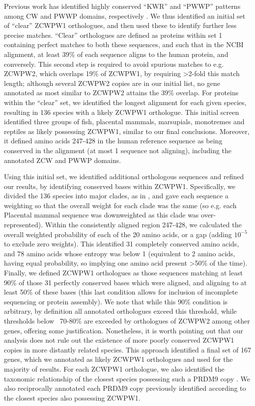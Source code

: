 Previous work has identified highly conserved “KWR” and “PWWP” patterns among CW and PWWP domains, respectively \parencite{He2010Structural, Qin2014Structure}.
We thus identified an initial set of “clear” ZCWPW1 orthologues, and then used these to identify further less precise matches.
“Clear” orthologues are defined as proteins within set 1 containing perfect matches to both these sequences, and such that in the NCBI alignment, at least 39\% of each sequence aligns to the human protein, and conversely.
This second step is required to avoid spurious matches to e.g. ZCWPW2, which overlaps 19\% of ZCWPW1, by requiring >2-fold this match length; although several ZCWPW2 copies are in our initial list, no gene annotated as most similar to ZCWPW2 attains the 39\% overlap.
For proteins within the “clear” set, we identified the longest alignment for each given species, resulting in 136 species with a likely ZCWPW1 orthologue.
This initial screen identified three groups of fish, placental mammals, marsupials, monotremes and reptiles as likely possessing ZCWPW1, similar to our final conclusions.
Moreover, it defined amino acids 247-428 in the human reference sequence as being conserved in the alignment (at most 1 sequence not aligning), including the annotated ZCW and PWWP domains.

Using this initial set, we identified additional orthologous sequences and refined our results, by identifying conserved bases within ZCWPW1.
Specifically, we divided the 136 species into major clades, as in \parencite{Baker2017Repeated}, and gave each sequence a weighting so that the overall weight for each clade was the same (so e.g. each Placental mammal sequence was downweighted as this clade was over-represented).
Within the consistently aligned region 247-428, we calculated the overall weighted probability of each of the 20 amino acids, or a gap (adding $10^{-5}$ to exclude zero weights).
This identified 31 completely conserved amino acids, and 78 amino acids whose entropy was below 1 (equivalent to 2 amino acids, having equal probability, so implying one amino acid present >50\% of the time).
Finally, we defined ZCWPW1 orthologues as those sequences matching at least 90\% of those 31 perfectly conserved bases which were aligned, and aligning to at least 50\% of these bases (this last condition allows for inclusion of incomplete sequencing or protein assembly).
We note that while this 90\% condition is arbitrary, by definition all annotated orthologues exceed this threshold, while thresholds below ~70-80\% are exceeded by orthologues of ZCWPW2 among other genes, offering some justification.
Nonetheless, it is worth pointing out that our analysis does not rule out the existence of more poorly conserved ZCWPW1 copies in more distantly related species.
This approach identified a final set of 167 genes, which we annotated as likely ZCWPW1 orthologues and used for the majority of results.
For each ZCWPW1 orthologue, we also identified the taxonomic relationship of the closest species possessing such a PRDM9 copy \iffalse(Supplementary Table 1)\fi.
We also reciprocally annotated each PRDM9 copy previously identified \parencite{Baker2017Repeated} according to the closest species also possessing ZCWPW1\iffalse(Supplementary Table 1)\fi.

